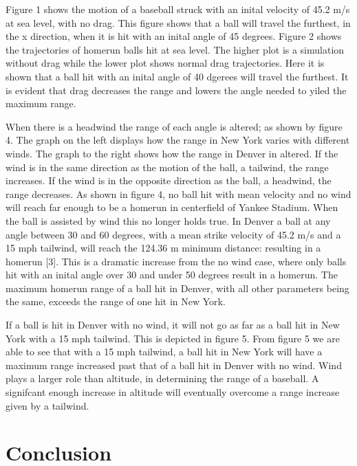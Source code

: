 \documentclass[11pt]{article}
\begin{document}
Figure 1 shows the motion of a baseball struck with an inital velocity of 45.2 m/s at sea level, with no drag.  This figure shows 
that a ball will travel the furthest, in the x direction, when it is hit with an inital angle of 45 degrees.  Figure 2 shows the 
trajectories of homerun balls hit at sea level.  The higher plot is a simulation without drag while the lower plot shows normal 
drag trajectories.  Here it is shown that a ball hit with an inital angle of 40 dgerees will travel the furthest.  It is evident 
that drag decreases the range and lowers the angle needed to yiled the maximum range.



When there is a headwind the range of each angle is altered; as shown by figure 4.  
The graph on the left displays how the range in New York varies with different winds.  The graph to the right shows 
how the range in Denver in altered.  If the wind is in the same direction 
as the motion of the ball, a tailwind, the range increases.  If the wind is in the opposite direction as the ball, a headwind, 
the range decreases.  As shown in figure 4, no ball hit with mean velocity and no wind will reach far enough to be a homerun 
in centerfield of Yankee Stadium.  When the ball is assisted by wind this no longer holds true.  In Denver a ball at any angle 
between 30 and 60 degrees, with a mean strike velocity of 45.2 m/s and a 15 mph tailwind, 
will reach the 124.36 m minimum distance: resulting in a 
homerun [3].  This is a dramatic increase from the no wind case, where only balls hit with an inital angle over 30 and under 50 
degrees result in a homerun.  The maximum homerun range of a ball hit 
in Denver, with all other parameters being the same, exceeds the range of one hit in New York.



If a ball is hit in Denver with no wind, it will not go as far as a ball hit in New York with a 15 mph tailwind.  
This is depicted in figure 5.  From figure 5 we are able to see that with a 15 mph tailwind, a ball hit  
in New York will have a maximum range increased past that of a ball hit in Denver with no wind.  
Wind plays a larger role than altitude, in determining the range of a baseball.  
A signifcant enough increase in altitude will eventually overcome a range increase given by a tailwind.



\section{Conclusion}
\end{document}
